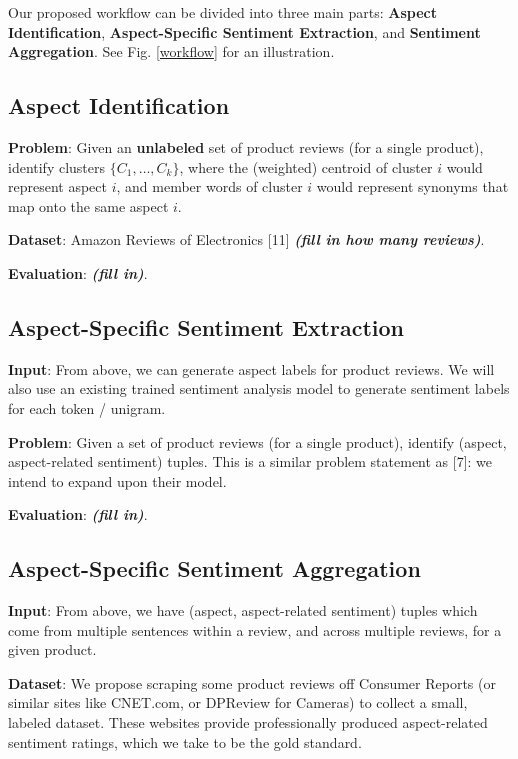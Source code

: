 \documentclass{article} %
\begin{document}
Our proposed workflow can be divided into three main parts: {\bf Aspect Identification}, {\bf Aspect-Specific Sentiment Extraction}, and {\bf Sentiment Aggregation}. See Fig. \ref{workflow} for an illustration.

\subsection{Aspect Identification}

\textbf{Problem}: Given an {\bf unlabeled} set of product reviews (for a single product), identify clusters $\{C_1,\ldots, C_k\}$, where the (weighted) centroid of cluster $i$ would represent aspect $i$, and member words of cluster $i$ would represent synonyms that map onto the same aspect $i$.

\textbf{Dataset}: Amazon Reviews of Electronics [11] {\it \bf (fill in how many reviews)}.

\textbf{Evaluation}: {\it \bf (fill in)}.

\subsection{Aspect-Specific Sentiment Extraction}

\textbf{Input}: From above, we can generate aspect labels for product reviews. We will also use an existing trained sentiment analysis model to generate sentiment labels for each token / unigram.

\textbf{Problem}: Given a set of product reviews (for a single product), identify (aspect, aspect-related sentiment) tuples. This is a similar problem statement as [7]: we intend to expand upon their model.

\textbf{Evaluation}: {\it \bf (fill in)}.

\subsection{Aspect-Specific Sentiment Aggregation}

\textbf{Input}: From above, we have (aspect, aspect-related sentiment) tuples which come from multiple sentences within a review, and across multiple reviews, for a given product.

\textbf{Dataset}: We propose scraping some product reviews off Consumer Reports (or similar sites like CNET.com, or DPReview for Cameras) to collect a small, labeled dataset. These websites provide professionally produced aspect-related sentiment ratings, which we take to be the gold standard.
\end{document}
